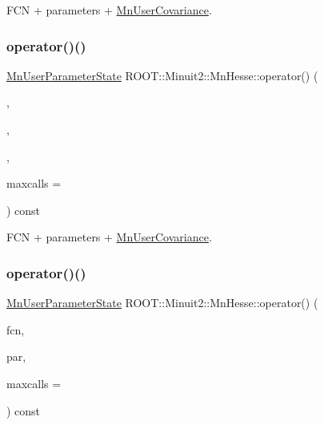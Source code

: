 F\+CN + parameters + \mbox{\hyperlink{classROOT_1_1Minuit2_1_1MnUserCovariance}{Mn\+User\+Covariance}}. 

\mbox{\label{classROOT_1_1Minuit2_1_1MnHesse_a5d575c4f72e0024578b07579a7e3a4a3}} 
\subsubsection{\texorpdfstring{operator()()}{operator()()}\hspace{0.1cm}{\footnotesize\ttfamily [6/16]}}
{\footnotesize\ttfamily \mbox{\hyperlink{classROOT_1_1Minuit2_1_1MnUserParameterState}{Mn\+User\+Parameter\+State}} R\+O\+O\+T\+::\+Minuit2\+::\+Mn\+Hesse\+::operator() (\begin{DoxyParamCaption}\item[{const \mbox{\hyperlink{classROOT_1_1Minuit2_1_1FCNBase}{F\+C\+N\+Base}} \&}]{,  }\item[{const std\+::vector$<$ double $>$ \&}]{,  }\item[{const \mbox{\hyperlink{classROOT_1_1Minuit2_1_1MnUserCovariance}{Mn\+User\+Covariance}} \&}]{,  }\item[{unsigned int}]{maxcalls = {} }\end{DoxyParamCaption}) const}



F\+CN + parameters + \mbox{\hyperlink{classROOT_1_1Minuit2_1_1MnUserCovariance}{Mn\+User\+Covariance}}. 

\mbox{\label{classROOT_1_1Minuit2_1_1MnHesse_ab7a2674f254e7f6056885d7d792ea671}} 
\subsubsection{\texorpdfstring{operator()()}{operator()()}\hspace{0.1cm}{\footnotesize\ttfamily [7/16]}}
{\footnotesize\ttfamily \mbox{\hyperlink{classROOT_1_1Minuit2_1_1MnUserParameterState}{Mn\+User\+Parameter\+State}} R\+O\+O\+T\+::\+Minuit2\+::\+Mn\+Hesse\+::operator() (\begin{DoxyParamCaption}\item[{const \mbox{\hyperlink{classROOT_1_1Minuit2_1_1FCNBase}{F\+C\+N\+Base}} \&}]{fcn,  }\item[{const \mbox{\hyperlink{classROOT_1_1Minuit2_1_1MnUserParameters}{Mn\+User\+Parameters}} \&}]{par,  }\item[{unsigned int}]{maxcalls = {} }\end{DoxyParamCaption}) const}

